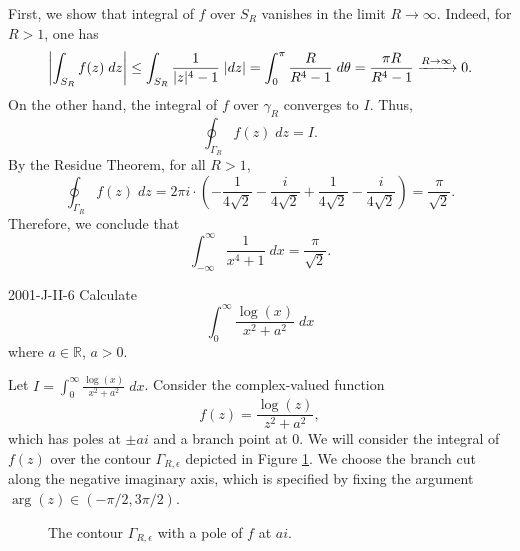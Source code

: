 \documentclass{article}
\begin{document}
	First, we show that integral of $f$ over $S_{R}$ vanishes in the limit $R \to \infty$. Indeed, for $R > 1$, one has 
	\begin{equation*}
		\left| \int_{S_{R}}f(z)\;dz \right| \leq \int_{S_{R}}\frac{1}{|z|^{4} - 1}\;|dz| = \int_{0}^{\pi}\frac{R}{R^{4} - 1}\;d\theta = \frac{\pi R}{R^{4} - 1} \xrightarrow{R \to \infty} 0. 
	\end{equation*}
	On the other hand, the integral of $f$ over $\gamma_{R}$ converges to $I$. Thus, 
	\begin{equation*}
		\oint_{\Gamma_{R}}f(z)\;dz = I. 
	\end{equation*}
	By the Residue Theorem, for all $R > 1$, 
	\begin{equation*}
		\oint_{\Gamma_{R}}f(z)\;dz = 2\pi i \cdot \left(-\frac{1}{4\sqrt{2}} -\frac{i}{4\sqrt{2}}+ \frac{1}{4\sqrt{2}} - \frac{i}{4\sqrt{2}}\right) = \frac{\pi}{\sqrt{2}}. 
	\end{equation*}
	Therefore, we conclude that 
	\begin{equation*}
		\int_{-\infty}^{\infty}\frac{1}{x^{4} + 1}\;dx = \frac{\pi}{\sqrt{2}}. 
	\end{equation*}
	\begin{prb}{2001-J-II-6}
		Calculate 
		\begin{equation*}
			\int_{0}^{\infty}\frac{\log(x)}{x^{2} + a^{2}}\;dx
		\end{equation*}
		where $a \in \mathbb{R}$, $a> 0$. 
	\end{prb}
	Let $I = \int_{0}^{\infty}\frac{\log(x)}{x^{2} + a^{2}}\;dx$. Consider the complex-valued function 
	\begin{equation*}
		f(z) = \frac{\log(z)}{z^{2} + a^{2}},
	\end{equation*}
	which has poles at $\pm ai$ and a branch point at $0$. We will consider the integral of $f(z)$ over the contour $\Gamma_{R, \epsilon}$ depicted in Figure \ref{fig:2001JII6}. We choose the branch cut along the negative imaginary axis, which is specified by fixing the argument $\arg(z) \in (-\pi/2, 3\pi/2)$. 
	\begin{figure}[h!]
		\centering
		\caption{The contour $\Gamma_{R,\epsilon}$ with a pole of $f$ at $ai$.}
		\label{fig:2001JII6}
	\end{figure}
\end{document}
